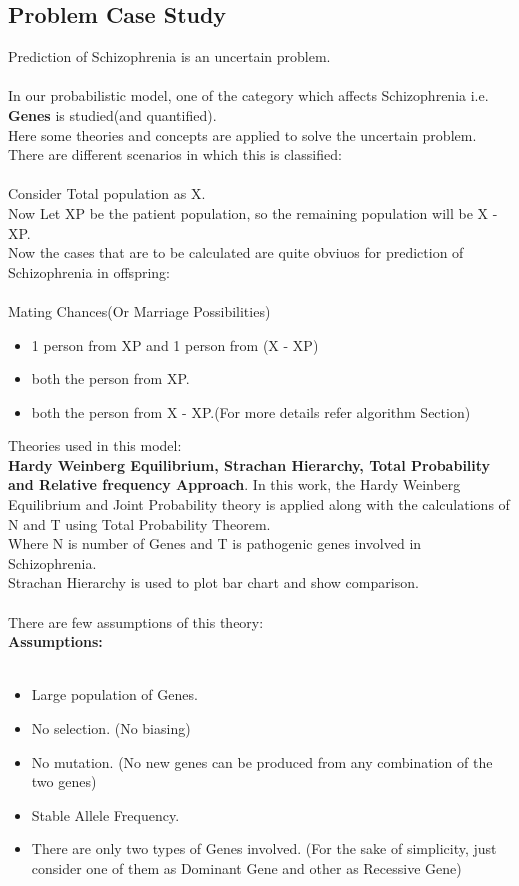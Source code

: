 \documentclass{article}
\begin{document}
\subsection{Problem Case Study}
Prediction of Schizophrenia is an uncertain problem. \\ \\
In our probabilistic model, one of the category which affects Schizophrenia i.e.  \textbf{Genes} is studied(and quantified). \\
Here some theories and concepts are applied to solve the uncertain problem. \\
There are different scenarios in which this is classified: \\ \\
Consider Total population as X. \\
Now Let XP be the patient population, so the remaining population will be  X - XP. \\
Now the cases that are to be calculated are quite obviuos for prediction of Schizophrenia in offspring: \\ \\
Mating Chances(Or Marriage Possibilities)
\begin{itemize}
    \item 1 person from XP and 1 person from (X - XP)
    \item both the person from XP.
    \item both the person from X - XP.(For more details refer algorithm Section) 
\end{itemize}
Theories used in this model: \\
\textbf{Hardy Weinberg Equilibrium, Strachan Hierarchy, Total Probability and Relative frequency Approach}.
\newpage 
In this work, the Hardy Weinberg Equilibrium and Joint Probability theory is applied along with the calculations of N and T using Total Probability Theorem. \\
Where N is number of Genes and T is pathogenic genes involved in Schizophrenia. \\
Strachan Hierarchy is used to plot bar chart and show comparison. \\
\\There are few assumptions of this theory: \\

\large{\textbf{Assumptions:}} \\ \\
\begin{itemize}
    \item Large population of Genes.
    \item No selection. (No biasing)
    \item No mutation. (No new genes can be produced from any combination of the two genes)
    \item Stable Allele Frequency.
    \item There are only two types of Genes involved. (For the sake of simplicity, just consider one of them as Dominant Gene and other as Recessive Gene)
\end{itemize}
\newpage
\large
\end{document}
